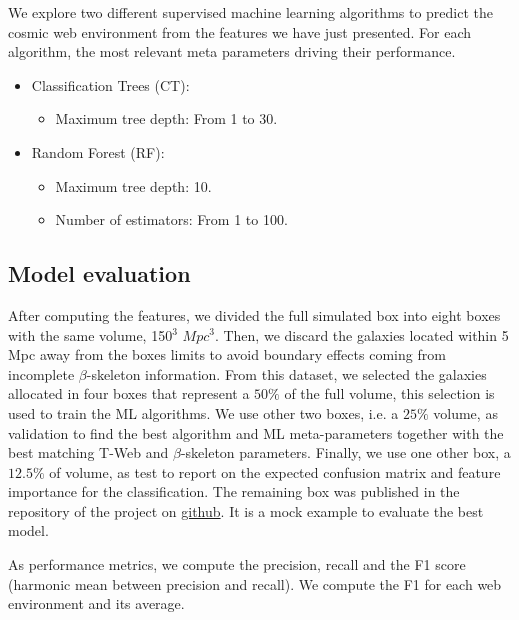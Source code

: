 \documentclass[usenatbib]{mnras}
\begin{document}
We explore two different supervised machine learning algorithms to
predict the cosmic web environment from the features we have just presented.
For each algorithm, the most relevant meta parameters driving their
performance.

\begin{itemize}
    \item Classification Trees (CT):
      \begin{itemize}
      \item Maximum tree depth: From 1 to 30.
      \end{itemize}
    \item Random Forest (RF):
        \begin{itemize}
            \item Maximum tree depth: 10.
            \item Number of estimators: From 1 to 100.
        \end{itemize}
\end{itemize}

\subsection{Model evaluation}

After computing the features, we divided the full simulated box into eight boxes with the same volume, 150$^3$ $Mpc^3$. Then, we discard the galaxies located within 5 Mpc away from the boxes limits to avoid boundary effects coming from incomplete $\beta$-skeleton information.  
From this dataset, we selected the galaxies allocated in four boxes that represent a $50\%$ of the full volume, this selection is used to train the ML algorithms.
We use other two boxes, i.e. a $25\%$ volume, as validation to find the best algorithm and ML
meta-parameters together with the best matching T-Web and
$\beta$-skeleton parameters.   
Finally, we use one other box, a $12.5\%$ of volume, as test to report
on the expected confusion matrix and feature importance for the classification. The remaining box was published in the repository of the project on \href{https://github.com/jsuarez314/cosmicweb_bsk}{github}. It is a mock example to evaluate the best model.

As performance metrics, we compute the precision, recall and the F1
score (harmonic mean between precision and recall).  
We compute the F1 for each web environment and its average.
\end{document}
